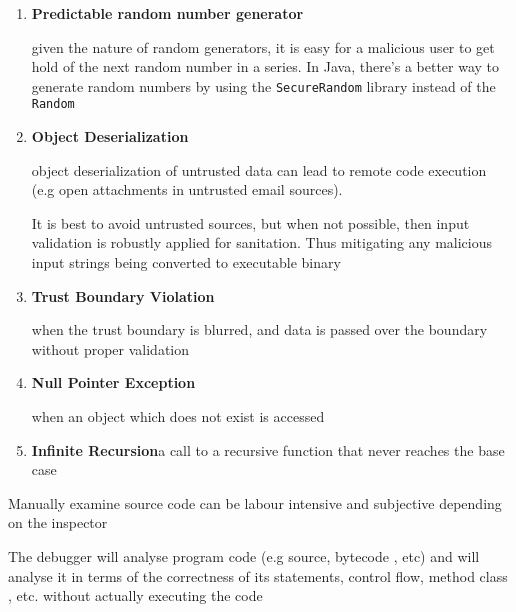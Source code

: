 	\begin{enumerate}
		\item\textbf{Predictable random number generator} \par{given the
 nature of random generators, it is easy for a malicious user to get
hold of the next random number in a series. In Java, there's a better way to
generate random numbers by using the \texttt{SecureRandom} library instead of
the \texttt{Random}}
		\item\textbf{Object Deserialization} \par{object deserialization of
untrusted data can lead to remote code execution (e.g open attachments in
untrusted email sources).}
		\par{It is best to avoid untrusted sources, but when not possible, then
input validation is robustly applied for sanitation. Thus mitigating any
malicious input strings being converted to executable binary}

		\item\textbf{Trust Boundary Violation}\par{when the trust boundary is
blurred, and data is passed over the boundary without proper validation}
		\item\textbf{Null Pointer Exception}\par{when an object which does not
exist is accessed}
		\item\textbf{Infinite Recursion}a call to a recursive function that
never reaches the base case
	\end{enumerate}	




\par{Manually examine source code can be labour intensive and subjective
depending on the inspector}


	\par{The debugger will analyse program code (e.g source, bytecode , etc) and
will analyse it in terms of the correctness of its statements, control flow,
method class , etc. without actually executing the code}
	
